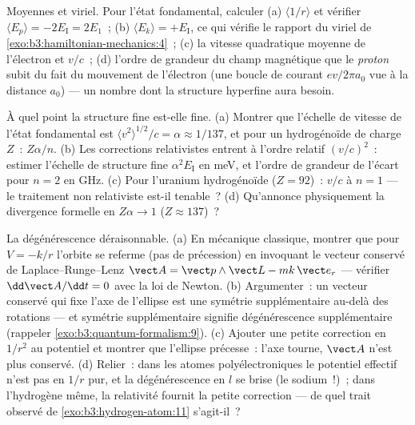 \begin{exercise}[$\star\star\star$]\label{exo:b3:hydrogen-atom:10}
Moyennes et viriel. Pour l'état fondamental, calculer (a)
$\langle 1/r\rangle$ et vérifier $\langle E_p\rangle = -2E_{\text{I}}
= 2E_1$~; (b) $\langle E_k\rangle = +E_{\text{I}}$, ce qui vérifie le
rapport du viriel de \cref{exo:b3:hamiltonian-mechanics:4}~; (c) la
vitesse quadratique moyenne de l'électron et $v/c$~; (d) l'ordre de grandeur du champ magnétique que le
\emph{proton} subit du fait du mouvement de l'électron (une boucle de
courant $ev/2\pi a_0$ vue à la distance $a_0$) --- un nombre dont la
structure hyperfine aura besoin.
\end{exercise}

\begin{exercise}[$\star\star\star$]\label{exo:b3:hydrogen-atom:11}
À quel point la structure fine est-elle fine. (a) Montrer que
l'échelle de vitesse de l'état fondamental est
$\langle v^2\rangle^{1/2}/c = \alpha \approx 1/137$, et pour un
hydrogénoïde de charge $Z$~: $Z\alpha/n$. (b) Les corrections
relativistes entrent à l'ordre relatif $(v/c)^2$~: estimer l'échelle
de structure fine $\alpha^2E_{\text{I}}$ en meV, et l'ordre de
grandeur de l'écart pour $n = 2$ en GHz. (c) Pour l'uranium
hydrogénoïde ($Z = 92$)~: $v/c$ à $n = 1$ --- le traitement non
relativiste est-il tenable~? (d) Qu'annonce physiquement la
divergence formelle en $Z\alpha \to 1$ ($Z \approx 137$)~?
\end{exercise}

\begin{exercise}[$\star\star\star$]\label{exo:b3:hydrogen-atom:12}
La dégénérescence déraisonnable. (a) En mécanique classique, montrer
que pour $V = -k/r$ l'orbite se referme (pas de précession) en
invoquant le vecteur conservé de Laplace--Runge--Lenz $\vect A = \vect p\wedge\vect
L - mk\,\vect e_r$ --- vérifier $\dd\vect A/\dd t = 0$ avec la loi de
Newton. (b) Argumenter~: un vecteur conservé qui fixe l'axe de
l'ellipse est une symétrie supplémentaire au-delà des rotations ---
et symétrie supplémentaire signifie dégénérescence supplémentaire
(rappeler \cref{exo:b3:quantum-formalism:9}). (c) Ajouter une
petite correction en $1/r^2$ au potentiel et montrer que l'ellipse
précesse~: l'axe tourne, $\vect A$ n'est plus conservé. (d)
Relier~: dans les atomes polyélectroniques le potentiel effectif n'est
pas en $1/r$ pur, et la dégénérescence en $l$ se brise (le sodium~!)~;
dans l'hydrogène même, la relativité fournit la petite correction ---
de quel trait observé de \cref{exo:b3:hydrogen-atom:11} s'agit-il~?
\end{exercise}

